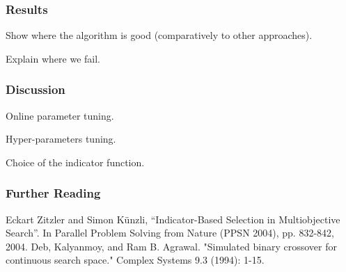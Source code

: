 \documentclass[12pt]{beamer}
\begin{document}
      \begin{frame}
    \frametitle{Results}
    Show where the algorithm is good (comparatively to other approaches).
    
    Explain where we fail.
  \end{frame}
  
      \begin{frame}
    \frametitle{Discussion}
    Online parameter tuning.
    
    Hyper-parameters tuning.
    
    Choice of the indicator function.
  \end{frame}
  
  \begin{frame}
  \end{frame}
  
    
  
\begin{frame}[allowframebreaks]
  \frametitle<presentation>{Further Reading}    
\begin{thebibliography}{}
\beamertemplatearticlebibitems
{} Eckart Zitzler and Simon Künzli, “Indicator-Based Selection in Multiobjective Search”. In Parallel Problem Solving from Nature (PPSN 2004), pp. 832-842, 2004.
 Deb, Kalyanmoy, and Ram B. Agrawal. "Simulated binary crossover for continuous search space." Complex Systems 9.3 (1994): 1-15.
\end{thebibliography}
\end{frame}
\end{document}
